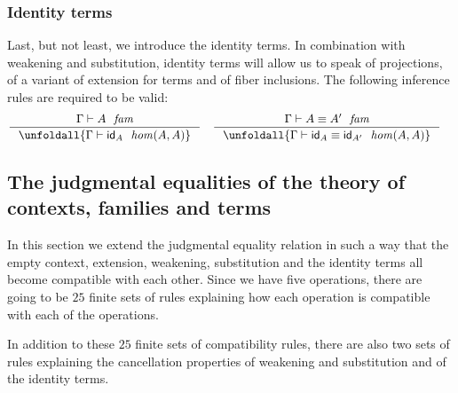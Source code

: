 \subsubsection{Identity terms}
\label{identityterms}
Last, but not least, we introduce the identity terms. In combination with
weakening and substitution, identity terms will allow us to speak of projections,
of a variant of extension for terms and of fiber inclusions. The following
inference rules are required to be valid:
\begin{align}
& \inference
  { \jfam{\Gamma}{A}
    }
  { \unfoldall{\jhom{\Gamma}{A}{A}{\idtm{A}}}
    }
& & \inference
    { \jfameq{\Gamma}{A}{A'}
      }
    { \unfoldall{\jhomeq{\Gamma}{A}{A}{\idtm{A}}{\idtm{A'}}}
      }
\end{align}

\subsection{The judgmental equalities of the theory of contexts, families and
terms}
In this section we extend the judgmental equality relation in such a way that
the empty context, extension, weakening, substitution and the identity terms
all become compatible with each other. Since we have five operations, there
are going to be $25$ finite sets of rules explaining how each operation is
compatible with each of the operations.

In addition to these $25$ finite sets
of compatibility rules, there are also two sets of rules explaining the
cancellation properties of weakening and substitution and of the identity terms.

